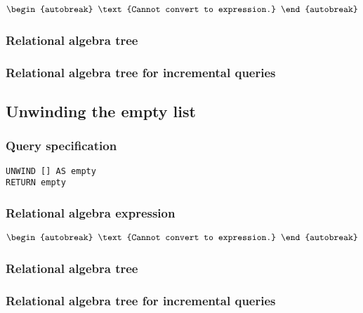 \begin{align*}
\begin{autobreak}
\text{Cannot convert to expression.}
\end{autobreak}
\end{align*}

\subsubsection*{Relational algebra tree}


\subsubsection*{Relational algebra tree for incremental queries}


\subsection{Unwinding the empty list}

\subsubsection*{Query specification}

\begin{lstlisting}
UNWIND [] AS empty
RETURN empty
\end{lstlisting}

\subsubsection*{Relational algebra expression}

\begin{align*}
\begin{autobreak}
\text{Cannot convert to expression.}
\end{autobreak}
\end{align*}

\subsubsection*{Relational algebra tree}


\subsubsection*{Relational algebra tree for incremental queries}

